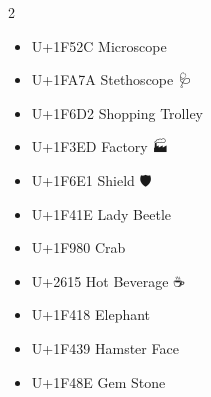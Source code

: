 \begin{multicols}{2}
\begin{itemize}
    \item U+1F52C Microscope                       🔬
    \item U+1FA7A Stethoscope                      🩺
    \item U+1F6D2 Shopping Trolley                 🛒
    \item U+1F3ED Factory                          🏭
    \item U+1F6E1 Shield                           🛡
    \item U+1F41E Lady Beetle                      🐞
    \item U+1F980 Crab                             🦀
    \item U+2615  Hot Beverage                     ☕
    \item U+1F418 Elephant                         🐘
    \item U+1F439 Hamster Face                     🐹
    \item U+1F48E Gem Stone                        💎
\end{itemize}
\end{multicols}
